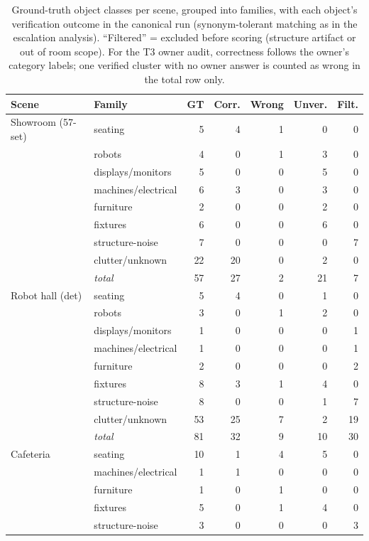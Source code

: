\begin{table}[t]
\centering
\caption{Ground-truth object classes per scene, grouped into families,
with each object's verification outcome in the canonical run
(synonym-tolerant matching as in the escalation analysis). ``Filtered''
= excluded before scoring (structure artifact or out of room scope).
For the T3 owner audit, correctness follows the owner's category
labels; one verified cluster with no owner answer is counted as wrong
in the total row only.}
\label{tab:classdist}
\footnotesize
\setlength{\tabcolsep}{3.5pt}
\begin{tabular}{@{}llrrrrr@{}}
\toprule
Scene & Family & GT & Corr. & Wrong & Unver. & Filt. \\
\midrule
Showroom (57-set) & seating & 5 & 4 & 1 & 0 & 0 \\
 & robots & 4 & 0 & 1 & 3 & 0 \\
 & displays/monitors & 5 & 0 & 0 & 5 & 0 \\
 & machines/electrical & 6 & 3 & 0 & 3 & 0 \\
 & furniture & 2 & 0 & 0 & 2 & 0 \\
 & fixtures & 6 & 0 & 0 & 6 & 0 \\
 & structure-noise & 7 & 0 & 0 & 0 & 7 \\
 & clutter/unknown & 22 & 20 & 0 & 2 & 0 \\
 & \emph{total} & 57 & 27 & 2 & 21 & 7 \\
\midrule
Robot hall (det) & seating & 5 & 4 & 0 & 1 & 0 \\
 & robots & 3 & 0 & 1 & 2 & 0 \\
 & displays/monitors & 1 & 0 & 0 & 0 & 1 \\
 & machines/electrical & 1 & 0 & 0 & 0 & 1 \\
 & furniture & 2 & 0 & 0 & 0 & 2 \\
 & fixtures & 8 & 3 & 1 & 4 & 0 \\
 & structure-noise & 8 & 0 & 0 & 1 & 7 \\
 & clutter/unknown & 53 & 25 & 7 & 2 & 19 \\
 & \emph{total} & 81 & 32 & 9 & 10 & 30 \\
\midrule
Cafeteria & seating & 10 & 1 & 4 & 5 & 0 \\
 & machines/electrical & 1 & 1 & 0 & 0 & 0 \\
 & furniture & 1 & 0 & 1 & 0 & 0 \\
 & fixtures & 5 & 0 & 1 & 4 & 0 \\
 & structure-noise & 3 & 0 & 0 & 0 & 3 \\

\end{tabular}
\end{table}

